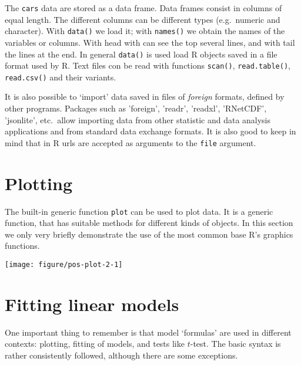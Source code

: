 \documentclass[paper=a4,headsepline,BCOR=12mm,twoside,open=right,%
titlepage,headings=small,fontsize=10pt,index=totoc,bibliography=totoc,%
captions=tableheading,captions=nooneline]{scrbook}\usepackage{knitr}
\begin{document}
The \texttt{cars} data are stored as a data frame. Data frames consist in columns of equal length. The different columns can be different types (e.g.\ numeric and character). With \texttt{data()} we load it; with \texttt{names()} we obtain the names of the variables or columns. With head with can see the top several lines, and with tail the lines at the end. In general \texttt{data()} is used load R objects saved in a file format used by R. Text files con be read with functions \texttt{scan()}, \texttt{read.table()}, \texttt{read.csv()} and their variants.

It is also possible to `import' data saved in files of \textit{foreign} formats, defined by other programs. Packages such as 'foreign', 'readr', 'readxl', 'RNetCDF', 'jsonlite', etc.\ allow importing data from other statistic and data analysis applications and from standard data exchange formats. It is also good to keep in mind that in R urls are accepted as arguments to the \texttt{file} argument.

\section{Plotting}

The built-in generic function \texttt{plot} can be used to plot data. It is a generic function, that has suitable methods for different kinds of objects. In this section we only very briefly demonstrate the use of the most common base R's graphics functions.

\begin{knitrout}\footnotesize
{}\color{fgcolor}\begin{kframe}
\begin{alltt}
 \hlopt{~}  
\end{alltt}
\end{kframe}

{\centering \texttt{[image: figure/pos-plot-2-1]} 

}



\end{knitrout}

\section{Fitting linear models}

One important thing to remember is that model `formulas' are used in different contexts: plotting, fitting of models, and tests like $t$-test. The basic syntax is rather consistently followed, although there are some exceptions.
\end{document}
